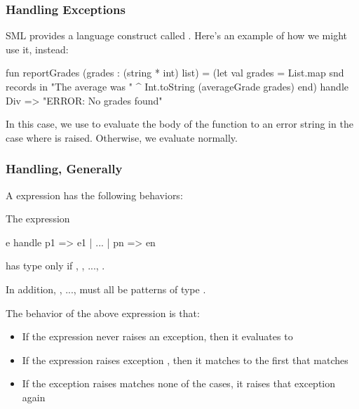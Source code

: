 \documentclass[aspectratio=169]{beamer}
\begin{document}
\begin{frame}[fragile]
  \frametitle{Handling Exceptions}

  SML provides a language construct called . Here's an example
  of how we might use it, instead:

  \pause
  \begin{codeblock}
    fun reportGrades (grades : (string * int) list) =
      (let
        val grades = List.map snd records
      in
        "The average was " ^ Int.toString (averageGrade grades) 
      end)
      handle Div => "ERROR: No grades found" 
  \end{codeblock}

  \pause
  \vspace{\fill}

  In this case, we use  to evaluate the body of the function to
  an error string in the case where  is raised. Otherwise, we 
  evaluate normally. 
\end{frame}

\begin{frame}[fragile]
  \frametitle{Handling, Generally}

  A  expression has the following behaviors: 

  \pause
  \vspace{\fill}

  The expression 
  \begin{codeblock}
    e handle p1 => e1 | ... | pn => en
  \end{codeblock}

  has type  only if , , ..., .

  \pause
  \vspace{5pt}

  In addition, , ...,  must all be patterns of type
  .

  \pause
  \vspace{\fill}

  The behavior of the above  expression is that: \pause 
  \begin{itemize}
    \item If the expression  never raises an exception, then it 
    evaluates to  \pause
    \item If the expression  raises exception , then
    it matches to the first  that matches  \pause
    \item If the exception  raises matches none of the
     cases, it raises that exception again 
  \end{itemize}
\end{frame}
\end{document}
